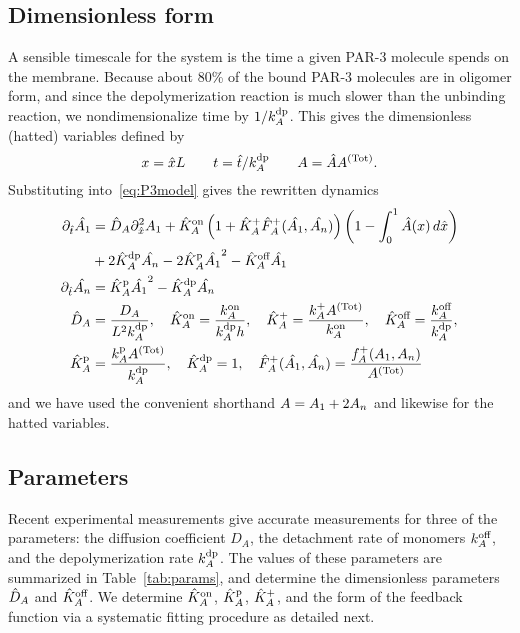 \documentclass[11pt]{article}
\newcommand{\6}[1]{#1_{\text{6}}}
\newcommand{\3}[1]{#1_{\text{3}}}
\newcommand{\Tot}[1]{#1^\text{(Tot)}}
\newcommand{\A}[1]{#1_A}
\begin{document}
\subsection{Dimensionless form}
A sensible timescale for the system is the time a given PAR-3 molecule spends on the membrane. Because about 80\% of the bound PAR-3 molecules are in oligomer form, and since the depolymerization reaction is much slower than the unbinding reaction, we nondimensionalize time by $1/\A{\kdp}$. This gives the dimensionless (hatted) variables defined by
\begin{equation*}
x = \hat{x} L \qquad t= \hat{t}/\A{\kdp} \qquad A= \hat{A}\Tot{A}.
\end{equation*}
Substituting into\ \eqref{eq:P3model} gives the rewritten dynamics
\begin{subequations}
\label{eq:PAR3gen}
\begin{align}
\nonumber
\Dthat \hat{\MA} & = \DhatA \Dxhat^2 \MA +\KhatonA \left(1+\KhatfA \hat F_A^+(\hat \MA, \hat \PA) \right)\left(1 - \int_0^1 \hat A(x) \, d\hat{x} \right) \\ 
\label{eq:Amono} &+ 2\KhatdpA \hat{\PA}-2\KhatpA \hat{\MA}^2 - \KhatoffA \hat{\MA} \\
\label{eq:Apoly}
\Dthat \hat{\PA} & =\KhatpA \hat{\MA}^2- \KhatdpA \hat{\PA} \\ 
\label{eq:paramsND}
\DhatA &=\frac{\A{D}}{L^2 \A{\kdp}}, \quad \KhatonA=\frac{\A{\kon}}{\A{\kdp} h }, \quad \KhatfA = \frac{\A{\kf}\Tot{A}}{\A{\kon}}, \quad  \KhatoffA = \frac{\A{\koff}}{\A{\kdp}}, \\ \nonumber \KhatpA &= \frac{\A{\kp} \Tot{A}}{\A{\kdp}}, \quad \KhatdpA=1, \quad \hat F_A^+(\hat \MA,\hat \PA) =\frac{\A{f}^+(\MA,\PA)}{\Tot{A}}
\end{align}
\end{subequations}
and we have used the convenient shorthand $A=A_1 + 2 A_n$ and likewise for the hatted variables. 

\subsection{Parameters}
Recent experimental measurements \cite{lang2023oligomerization} give accurate measurements for three of the parameters: the diffusion coefficient $D_A$, the detachment rate of monomers $k^\text{off}_A$, and the depolymerization rate $k^\text{dp}_A$. The values of these parameters are summarized in Table\ \ref{tab:params}, and determine the dimensionless parameters $\hat{D}_A$ and $\hat{K}^\text{off}_A$. We determine $\hat{K}^\text{on}_A$, $\hat{K}^\text{p}_A$, $\hat{K}^\text{+}_A$, and the form of the feedback function via a systematic fitting procedure as detailed next.
\end{document}
